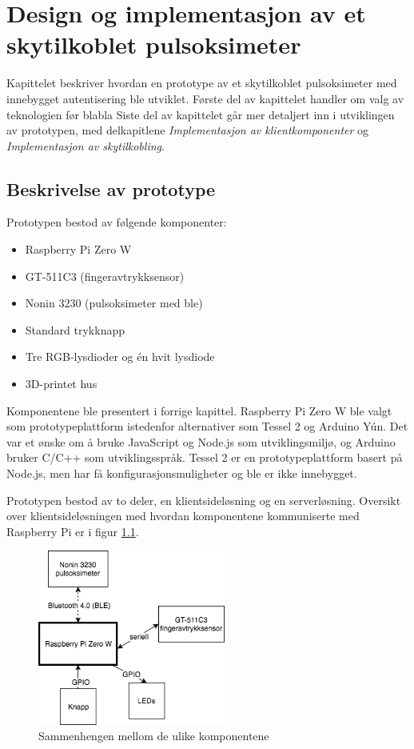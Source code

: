 \chapter{Design og implementasjon av et skytilkoblet pulsoksimeter}
\label{ch:implementation1}

Kapittelet beskriver hvordan en prototype av et skytilkoblet pulsoksimeter med innebygget autentisering ble utviklet.
Første del av kapittelet handler om valg av teknologien før blabla
Siste del av kapittelet går mer detaljert inn i utviklingen av prototypen, med delkapitlene
\textit{Implementasjon av klientkomponenter} og \textit{Implementasjon av skytilkobling}.

\section{Beskrivelse av prototype}
Prototypen bestod av følgende komponenter:

\begin{itemize}
  \item Raspberry Pi Zero W
  \item GT-511C3 (fingeravtrykksensor)
  \item Nonin 3230 (pulsoksimeter med \gls{ble})
  \item Standard trykknapp
  \item Tre RGB-lysdioder og én hvit lysdiode
  \item 3D-printet hus
\end{itemize}

Komponentene ble presentert i forrige kapittel. Raspberry Pi Zero W ble valgt som prototypeplattform istedenfor
alternativer som Tessel 2 og Arduino Yún. Det var et ønske om å bruke JavaScript og Node.js som utviklingsmiljø, og Arduino
bruker C/C++ som utviklingsspråk. Tessel 2 er en prototypeplattform basert på Node.js, men har få konfigurasjonsmuligheter
og \gls{ble} er ikke innebygget.

Prototypen bestod av to deler, en klientsideløsning og en serverløsning.
Oversikt over klientsideløsningen med hvordan komponentene kommuniserte med Raspberry Pi er i figur \ref{fig:prototypeoversikt}.
\begin{figure}
\includegraphics[width=0.55\textwidth, center]{fig/prototype/oversiktlosning}
\caption{Sammenhengen mellom de ulike komponentene}
\label{fig:prototypeoversikt}
\end{figure}

